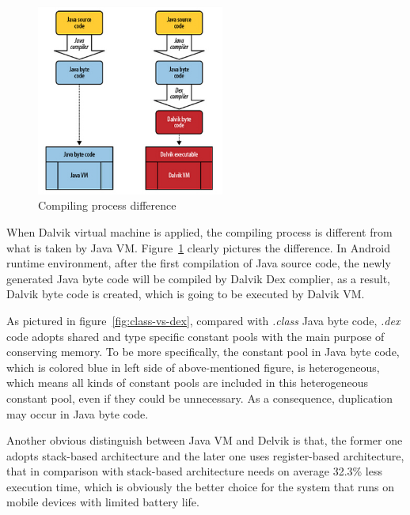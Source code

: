  \begin{figure}[!htb]
	\centering
	\includegraphics[width=0.55\textwidth]{vm-compare.jpg}
		\caption{Compiling process difference\cite{learn_android}}
	\label{fig:vm-compare}
\end{figure}
When Dalvik virtual machine is applied, the compiling process is different from what is taken by Java VM. Figure~\ref{fig:vm-compare} clearly pictures the difference. In Android runtime environment, after the first compilation of Java source code, the newly generated Java byte code will be compiled by Dalvik Dex complier, as a result, Dalvik byte code is created, which is going to be executed by Dalvik VM.

As pictured in figure~\ref{fig:class-vs-dex}, compared with \emph{.class} Java byte code, \emph{.dex} code adopts shared and type specific constant pools with the main purpose of conserving memory\cite{android_vm}. To be more specifically,  the constant pool in Java byte code, which is colored blue in left side of above-mentioned figure, is heterogeneous, which means all kinds of constant pools are included in this heterogeneous constant pool, even if they could be unnecessary. As a consequence, duplication may occur in Java byte code.    

Another obvious distinguish between Java VM and Delvik is that, the former one adopts stack-based architecture and  the later one uses register-based architecture, that in comparison with stack-based architecture needs on average 32.3\% less execution time\cite{android_vm}, which is obviously the better choice for the system that runs on mobile devices with limited battery life.

